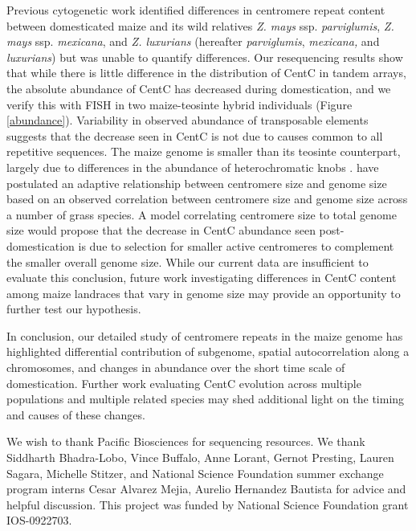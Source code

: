 Previous cytogenetic work  identified  differences in centromere repeat content  between domesticated maize and its wild relatives \emph{Z. mays} ssp. \emph{parviglumis}, \emph{Z. mays} ssp. \emph{mexicana}, and \emph{Z. luxurians} (hereafter \emph{parviglumis}, \emph{mexicana,} and \emph{luxurians}) \citep{Albert2010} but was unable to quantify  differences. 
Our resequencing results show that while there is little difference in the distribution of CentC in tandem arrays, the absolute abundance of CentC has  decreased during domestication, and we verify this with FISH in two maize-teosinte hybrid individuals (Figure \ref{abundance}). 
Variability in observed abundance of transposable elements \citep{Chia2012} suggests that the decrease seen in CentC is not due to causes common to all repetitive sequences.
The maize genome is smaller than its teosinte counterpart, largely due to differences in the abundance of heterochromatic knobs \citep{poggio1998}.  \citet{Zhang2012} have postulated an adaptive relationship between centromere size and genome size based on an observed correlation between centromere size and genome size across a number of grass species.  
A model correlating centromere size to total genome size would propose that the decrease in CentC abundance seen post-domestication is due to selection for smaller active centromeres to complement the smaller overall genome size.
While our current data are insufficient to evaluate this conclusion, future work investigating differences in CentC content among maize landraces that vary in genome size \citep{poggio1998} may provide an opportunity to further test our hypothesis.  

In conclusion, our detailed study of centromere repeats in the maize genome has highlighted differential contribution of subgenome, spatial autocorrelation along a chromosomes, and changes in abundance over the short time scale of domestication.  Further work evaluating CentC evolution across multiple populations and multiple related species may shed additional light on the timing and causes of these changes.  


\begin{acknowledgements}
We wish to thank Pacific Biosciences for sequencing resources.  We thank Siddharth Bhadra-Lobo, Vince Buffalo, Anne Lorant, Gernot Presting, Lauren Sagara, Michelle Stitzer, and National Science Foundation summer exchange program interns Cesar Alvarez Mejia, Aurelio Hernandez Bautista for advice and helpful discussion. This project was funded by National Science Foundation grant IOS-0922703.
\end{acknowledgements}

